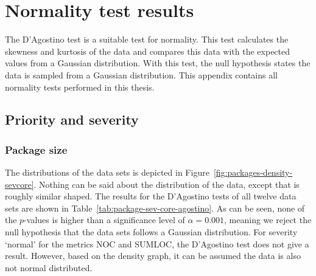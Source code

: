 
\chapter{Normality test results} %
\label{cha:normality_tests}
The D'Agostino test is a suitable test for normality. This test calculates the skewness and kurtosis of the data and compares this data with the expected values from a Gaussian distribution. With this test, the null hypothesis states the data is sampled from a Gaussian distribution. This appendix contains all normality tests performed in this thesis.

\section{Priority and severity} %
\label{sec:priority_and_severity}

\subsection{Package size} %
\label{sub:norm:package_size}
The distributions of the data sets is depicted in Figure~\ref{fig:packages-density-sevcore}. Nothing can be said about the distribution of the data, except that is roughly similar shaped.  The results for the D'Agostino tests of all twelve data sets are shown in Table~\ref{tab:package-sev-core-agostino}. As can be seen, none of the $p$-values is higher than a significance level of $\alpha = 0.001$, meaning we reject the null hypothesis that the data sets follows a Gaussian distribution. For severity `normal' for the metrics NOC and SUMLOC, the D'Agostino test does not give a result. However, based on the density graph, it can be assumed the data is also not normal distributed.

